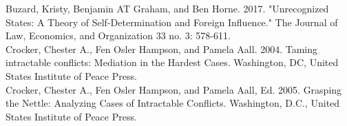 \documentclass[12pt]{article}
\begin{document}
Buzard, Kristy, Benjamin AT Graham, and Ben Horne. 2017. "Unrecognized States: A Theory of Self-Determination and Foreign Influence." The Journal of Law, Economics, and Organization 33 no. 3: 578-611.\\

Crocker, Chester A., Fen Osler Hampson, and Pamela Aall. 2004. Taming intractable conflicts: Mediation in the Hardest Cases. Washington, DC, United States Institute of Peace Press. \\

Crocker, Chester A., Fen Osler Hampson, and Pamela Aall, Ed. 2005. Grasping the Nettle: Analyzing Cases of Intractable Conflicts. Washington, D.C., United States Institute of Peace Press.\\
\end{document}
